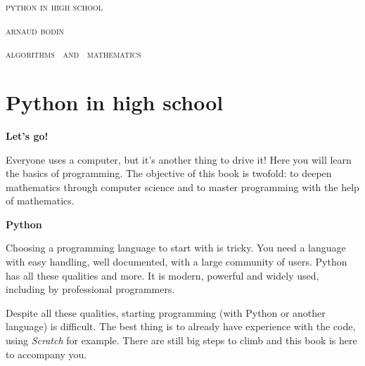 
\pagestyle{empty}\thispagestyle{empty}
\vspace*{\fill}
\vspace*{5ex}
\begin{center}
\fontsize{40}{40}\selectfont
\textsc{python in high school}


\vspace*{2ex}

\Large
\textsc{arnaud bodin}

\end{center}
\vfill
\begin{center}
\Large
\textsc{algorithms \  and  \  mathematics}
\end{center}
\begin{center}
\end{center}

\clearpage

\thispagestyle{empty}

\vspace*{\fill}
\section*{Python in high school}

{\large\textbf{Let's go!}}

Everyone uses a computer, but it's another thing to drive it! Here you will learn the basics of programming. The objective of this book is twofold: to deepen mathematics through computer science and to master programming with the help of mathematics. 

\bigskip

{\large\textbf{Python}}

Choosing a programming language to start with is tricky. You need a language with easy handling, well documented, with a large community of users. Python has all these qualities and more. It is modern, powerful and widely used, including by professional programmers. 

Despite all these qualities, starting programming (with Python or another language) is difficult. The best thing is to already have experience with the code, using \emph{Scratch} for example. There are still big steps to climb and this book is here to accompany you.

